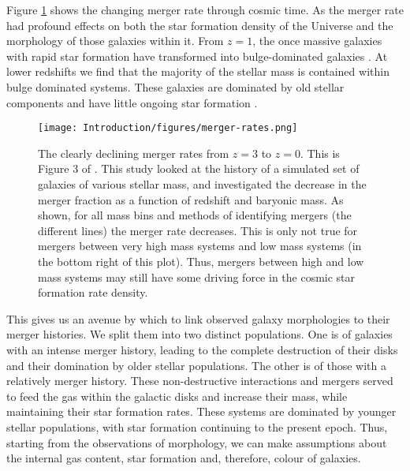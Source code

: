 \DIFaddend Figure \ref{fig:merger-rate} shows the changing merger rate through cosmic time. As \DIFaddbegin {}\DIFaddend the merger rate \DIFdelbegin {}\DIFdelend \DIFaddbegin {}\DIFaddend had profound effects on both the star formation density of the Universe and the morphology of those galaxies within it. From $z = 1$, the once massive galaxies with rapid star formation have transformed into bulge-dominated galaxies \DIFdelbegin {}\DIFdelend \citep{2007ApJ...654..858B}. At lower redshifts we find that the majority of the stellar mass is contained within bulge dominated systems. These galaxies are dominated by old stellar components and have little ongoing star formation \citep{2002AJ....124..646H, 2004ApJ...608..752B}.
\DIFdelbegin {}\DIFdelend 

\begin{figure}
\centering
\texttt{[image: Introduction/figures/merger-rates.png]}
\caption[The declining merger rates from z = 3 to z = 0.]{The clearly declining merger rates from $z = 3$ to $z = 0$. This is Figure 3 of \citet{2010ApJ...715..202H}. This study looked at the history of a simulated set of galaxies of various stellar mass, and investigated the decrease in the merger fraction as a function of redshift and baryonic mass. As shown, for all mass bins and methods of identifying mergers (the different lines) the merger rate decreases. This is only not true for mergers between very high mass systems and low mass systems (in the bottom right of this plot). Thus, mergers between high and low mass systems may still have some driving force in the cosmic star formation rate density.}
\label{fig:merger-rate}
\end{figure}

This gives us an avenue by which to link observed galaxy morphologies to their merger histories. We split them into two distinct populations. One is of galaxies with an intense merger history, leading to the complete destruction of their disks and their domination by older stellar populations. The other is of those with a relatively \DIFdelbegin {}\DIFdelend \DIFaddbegin {}\DIFaddend merger history. These non-destructive interactions and mergers served to feed the gas within the galactic disks and increase their mass, while maintaining their star formation rates. These systems are dominated by younger stellar populations, with star formation continuing to the present epoch. Thus, starting from the observations of morphology, we can make assumptions about the internal gas content, star formation and, therefore, colour of galaxies.

